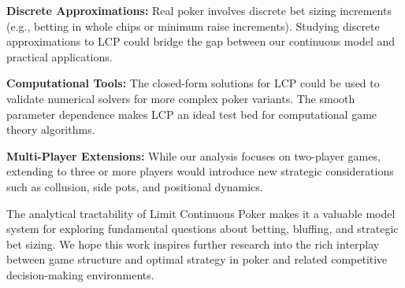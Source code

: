 \documentclass[../../main/main.tex]{subfiles}
\begin{document}
\textbf{Discrete Approximations:} Real poker involves discrete bet sizing increments (e.g., betting in whole chips or minimum raise increments). Studying discrete approximations to LCP could bridge the gap between our continuous model and practical applications.

\textbf{Computational Tools:} The closed-form solutions for LCP could be used to validate numerical solvers for more complex poker variants. The smooth parameter dependence makes LCP an ideal test bed for computational game theory algorithms.

\textbf{Multi-Player Extensions:} While our analysis focuses on two-player games, extending to three or more players would introduce new strategic considerations such as collusion, side pots, and positional dynamics.

The analytical tractability of Limit Continuous Poker makes it a valuable model system for exploring fundamental questions about betting, bluffing, and strategic bet sizing. We hope this work inspires further research into the rich interplay between game structure and optimal strategy in poker and related competitive decision-making environments.
\end{document}
